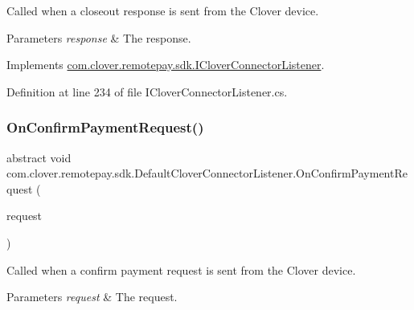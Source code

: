 Called when a closeout response is sent from the Clover device. 


\begin{DoxyParams}{Parameters}
{\em response} & The response.\\
\hline
\end{DoxyParams}


Implements \hyperlink{interfacecom_1_1clover_1_1remotepay_1_1sdk_1_1_i_clover_connector_listener_a8558c8169f271fa5b26994be50464fb6}{com.\+clover.\+remotepay.\+sdk.\+I\+Clover\+Connector\+Listener}.



Definition at line 234 of file I\+Clover\+Connector\+Listener.\+cs.

\mbox{\label{classcom_1_1clover_1_1remotepay_1_1sdk_1_1_default_clover_connector_listener_ae3a107836a054cedfac615a5fbe72469}} 
\subsubsection{\texorpdfstring{On\+Confirm\+Payment\+Request()}{OnConfirmPaymentRequest()}}
{\footnotesize\ttfamily abstract void com.\+clover.\+remotepay.\+sdk.\+Default\+Clover\+Connector\+Listener.\+On\+Confirm\+Payment\+Request (\begin{DoxyParamCaption}\item[{\hyperlink{classcom_1_1clover_1_1remotepay_1_1sdk_1_1_confirm_payment_request}{Confirm\+Payment\+Request}}]{request }\end{DoxyParamCaption})\hspace{0.3cm}{\ttfamily [pure virtual]}}



Called when a confirm payment request is sent from the Clover device. 


\begin{DoxyParams}{Parameters}
{\em request} & The request.\\
\hline
\end{DoxyParams}


